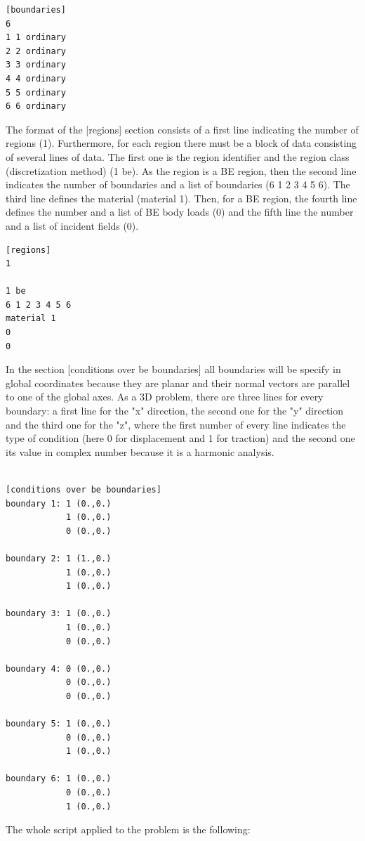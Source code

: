 \documentclass[a4]{article}
\begin{document}
\begin{Verbatim}	
[boundaries]
6
1 1 ordinary
2 2 ordinary
3 3 ordinary
4 4 ordinary
5 5 ordinary
6 6 ordinary
\end{Verbatim}

The format of the [regions] section consists of a first line indicating the number of regions (1). Furthermore, for each region there must be a block of data consisting of several lines of data. The first one is the region identifier and the region class (discretization method) (1 be). As the region is a BE region, then the second line indicates the number of boundaries and a list of boundaries (6 1 2 3 4 5 6). The third line defines the material (material 1). Then, for a BE region, the fourth line defines the number and a list of BE body loads (0) and the fifth line the number and a list of incident fields (0).

\begin{Verbatim}	
[regions]
1

1 be
6 1 2 3 4 5 6
material 1
0
0
\end{Verbatim}

In the section [conditions over be boundaries] all boundaries will be specify in global coordinates because they are planar and their normal vectors are parallel to one of the global axes. As a 3D problem, there are three lines for every boundary: a first line for the "x" direction, the second one for the "y" direction and the third one for the "z", where the first number of every line indicates the type of condition (here 0 for displacement and 1 for traction) and the second one its value in complex number because it is a harmonic analysis.

\begin{Verbatim}	

[conditions over be boundaries]
boundary 1: 1 (0.,0.)
            1 (0.,0.)
            0 (0.,0.)

boundary 2: 1 (1.,0.)
            1 (0.,0.)
            1 (0.,0.)

boundary 3: 1 (0.,0.)
            1 (0.,0.)
            0 (0.,0.)

boundary 4: 0 (0.,0.)
            0 (0.,0.)
            0 (0.,0.)

boundary 5: 1 (0.,0.)
            0 (0.,0.)
            1 (0.,0.)

boundary 6: 1 (0.,0.)
            0 (0.,0.)
            1 (0.,0.)
\end{Verbatim}

The whole script applied to the problem is the following:
\end{document}
